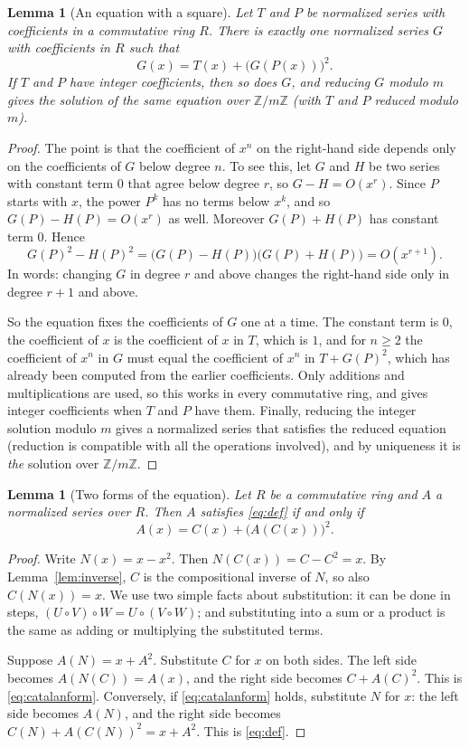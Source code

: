 \documentclass[11pt,a4paper]{article}
\newtheorem{lemma}[theorem]{Lemma}
\theoremstyle{definition}
\theoremstyle{remark}
\newcommand{\Z}{\mathbb{Z}}
\begin{document}
\begin{lemma}[An equation with a square]\label{lem:square}
Let $T$ and $P$ be normalized series with coefficients in a commutative ring $R$. There is exactly one normalized
series $G$ with coefficients in $R$ such that
\[
G(x)=T(x)+\bigl(G(P(x))\bigr)^2 .
\]
If $T$ and $P$ have integer coefficients, then so does $G$, and reducing $G$ modulo $m$ gives the solution of the same
equation over $\Z/m\Z$ (with $T$ and $P$ reduced modulo $m$).
\end{lemma}

\begin{proof}
The point is that the coefficient of $x^n$ on the right-hand side depends only on the coefficients of $G$ below degree
$n$. To see this, let $G$ and $H$ be two series with constant term $0$ that agree below degree $r$, so $G-H=O(x^r)$.
Since $P$ starts with $x$, the power $P^k$ has no terms below $x^k$, and so $G(P)-H(P)=O(x^r)$ as well. Moreover
$G(P)+H(P)$ has constant term $0$. Hence
\[
G(P)^2-H(P)^2=\bigl(G(P)-H(P)\bigr)\bigl(G(P)+H(P)\bigr)=O(x^{r+1}).
\]
In words: changing $G$ in degree $r$ and above changes the right-hand side only in degree $r+1$ and above.

So the equation fixes the coefficients of $G$ one at a time. The constant term is $0$, the coefficient of $x$ is the
coefficient of $x$ in $T$, which is $1$, and for $n\ge2$ the coefficient of $x^n$ in $G$ must equal the coefficient of
$x^n$ in $T+G(P)^2$, which has already been computed from the earlier coefficients. Only additions and multiplications
are used, so this works in every commutative ring, and gives integer coefficients when $T$ and $P$ have them. Finally,
reducing the integer solution modulo $m$ gives a normalized series that satisfies the reduced equation (reduction is
compatible with all the operations involved), and by uniqueness it is \emph{the} solution over $\Z/m\Z$.
\end{proof}

\begin{lemma}[Two forms of the equation]\label{lem:forms}
Let $R$ be a commutative ring and $A$ a normalized series over $R$. Then $A$ satisfies \eqref{eq:def} if and only if
\begin{equation}\label{eq:catalanform}
A(x)=C(x)+\bigl(A(C(x))\bigr)^2 .
\end{equation}
\end{lemma}

\begin{proof}
Write $N(x)=x-x^2$. Then $N(C(x))=C-C^2=x$. By Lemma~\ref{lem:inverse}, $C$ is the compositional inverse of $N$, so also
$C(N(x))=x$. We use two simple facts about substitution: it can be done in steps, $(U\circ V)\circ W=U\circ(V\circ W)$;
and substituting into a sum or a product is the same as adding or multiplying the substituted terms.

Suppose $A(N)=x+A^2$. Substitute $C$ for $x$ on both sides. The left side becomes $A(N(C))=A(x)$, and the right side
becomes $C+A(C)^2$. This is \eqref{eq:catalanform}. Conversely, if \eqref{eq:catalanform} holds, substitute $N$ for $x$:
the left side becomes $A(N)$, and the right side becomes $C(N)+A(C(N))^2=x+A^2$. This is \eqref{eq:def}.
\end{proof}
\end{document}
